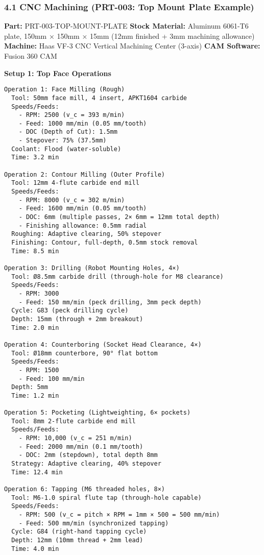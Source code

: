 \documentclass[
]{article}
\begin{document}
\hypertarget{cnc-machining-prt-003-top-mount-plate-example}{%
\subsubsection{4.1 CNC Machining (PRT-003: Top Mount Plate
Example)}\label{cnc-machining-prt-003-top-mount-plate-example}}

\textbf{Part:} PRT-003-TOP-MOUNT-PLATE \textbf{Stock Material:} Aluminum
6061-T6 plate, 150mm × 150mm × 15mm (12mm finished + 3mm machining
allowance) \textbf{Machine:} Haas VF-3 CNC Vertical Machining Center
(3-axis) \textbf{CAM Software:} Fusion 360 CAM

\textbf{Setup 1: Top Face Operations}

\begin{verbatim}
Operation 1: Face Milling (Rough)
  Tool: 50mm face mill, 4 insert, APKT1604 carbide
  Speeds/Feeds:
    - RPM: 2500 (v_c = 393 m/min)
    - Feed: 1000 mm/min (0.05 mm/tooth)
    - DOC (Depth of Cut): 1.5mm
    - Stepover: 75% (37.5mm)
  Coolant: Flood (water-soluble)
  Time: 3.2 min

Operation 2: Contour Milling (Outer Profile)
  Tool: 12mm 4-flute carbide end mill
  Speeds/Feeds:
    - RPM: 8000 (v_c = 302 m/min)
    - Feed: 1600 mm/min (0.05 mm/tooth)
    - DOC: 6mm (multiple passes, 2× 6mm = 12mm total depth)
    - Finishing allowance: 0.5mm radial
  Roughing: Adaptive clearing, 50% stepover
  Finishing: Contour, full-depth, 0.5mm stock removal
  Time: 8.5 min

Operation 3: Drilling (Robot Mounting Holes, 4×)
  Tool: Ø8.5mm carbide drill (through-hole for M8 clearance)
  Speeds/Feeds:
    - RPM: 3000
    - Feed: 150 mm/min (peck drilling, 3mm peck depth)
  Cycle: G83 (peck drilling cycle)
  Depth: 15mm (through + 2mm breakout)
  Time: 2.0 min

Operation 4: Counterboring (Socket Head Clearance, 4×)
  Tool: Ø18mm counterbore, 90° flat bottom
  Speeds/Feeds:
    - RPM: 1500
    - Feed: 100 mm/min
  Depth: 5mm
  Time: 1.2 min

Operation 5: Pocketing (Lightweighting, 6× pockets)
  Tool: 8mm 2-flute carbide end mill
  Speeds/Feeds:
    - RPM: 10,000 (v_c = 251 m/min)
    - Feed: 2000 mm/min (0.1 mm/tooth)
    - DOC: 2mm (stepdown), total depth 8mm
  Strategy: Adaptive clearing, 40% stepover
  Time: 12.4 min

Operation 6: Tapping (M6 threaded holes, 8×)
  Tool: M6-1.0 spiral flute tap (through-hole capable)
  Speeds/Feeds:
    - RPM: 500 (v_c = pitch × RPM = 1mm × 500 = 500 mm/min)
    - Feed: 500 mm/min (synchronized tapping)
  Cycle: G84 (right-hand tapping cycle)
  Depth: 12mm (10mm thread + 2mm lead)
  Time: 4.0 min
\end{verbatim}
\end{document}
